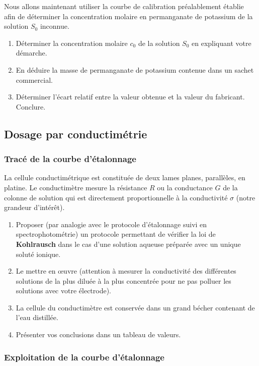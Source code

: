 \documentclass[a4paper, 11pt, final, garamond]{book}
\begin{document}
Nous allons maintenant utiliser la courbe de calibration préalablement établie
afin de déterminer la concentration molaire en permanganate de potassium de la
solution $S_0$ inconnue.

\begin{enumerate}
    \item Déterminer la concentration molaire $c_0$ de la solution $S_0$ en
        expliquant votre démarche.
    \item En déduire la masse de permanganate de potassium contenue dans un
        sachet commercial.
    \item Déterminer l'écart relatif entre la valeur obtenue et la valeur du
        fabricant. Conclure.
\end{enumerate}

\subsection{Dosage par conductimétrie}
\subsubsection{Tracé de la courbe d'étalonnage}

La cellule conductimétrique est constituée de deux lames planes, parallèles, en
platine. Le conductimètre mesure la résistance $R$ ou la conductance $G$ de la
colonne de solution qui est directement proportionnelle à la conductivité
$\sigma$ (notre grandeur d'intérêt).

\begin{enumerate}
    \item Proposer (par analogie avec le protocole d'étalonnage suivi en
        spectrophotométrie) un protocole permettant de vérifier la loi de
        \textbf{Kohlrausch} dans le cas d'une solution aqueuse préparée avec un
        unique soluté ionique.
    \item Le mettre en œuvre (attention à mesurer la conductivité des
        différentes solutions de la plus diluée à la plus concentrée pour ne pas
        polluer les solutions avec votre électrode).
    \item La cellule du conductimètre est conservée dans un grand bécher
        contenant de l'eau distillée.
    \item Présenter vos conclusions dans un tableau de valeurs.
\end{enumerate}

\subsubsection{Exploitation de la courbe d'étalonnage}
\end{document}
